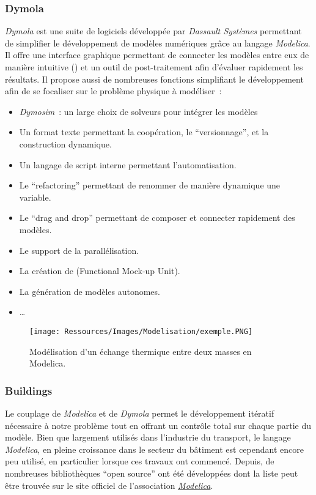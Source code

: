 \subsubsection{Dymola} %
\label{ssub:dymola}
\textit{Dymola} est une suite de logiciels développée par \textit{Dassault Systèmes}
permettant de simplifier le développement de modèles numériques grâce au langage
\textit{Modelica}. Il offre une interface graphique permettant de connecter les modèles
entre eux de manière intuitive () et un outil de
post-traitement afin d’évaluer rapidement les résultats. Il propose aussi de nombreuses fonctions
simplifiant le développement afin de se focaliser sur le problème physique à modéliser~:
\begin{itemize}
    \item \textit{Dymosim}~: un large choix de solveurs pour intégrer les modèles
    \item Un format texte permettant la coopération, le \enquote{versionnage}, et la construction dynamique.
    \item Un langage de script interne permettant l’automatisation.
    \item Le \enquote{refactoring} permettant de renommer de manière dynamique une variable.
    \item Le \enquote{drag and drop} permettant de composer et connecter rapidement des modèles.
    \item Le support de la parallélisation.
    \item La création de  (Functional Mock-up Unit).
    \item La génération de modèles autonomes.
    \item \dots
\end{itemize}

\begin{figure}
    \centering
    \texttt{[image: Ressources/Images/Modelisation/exemple.PNG]}
    \caption[Modélisation d’un échange thermique entre deux masses en Modelica]
            {Modélisation d’un échange thermique entre deux masses en Modelica.}
    \label{fig:exemple_modelica}
\end{figure}


\subsubsection{Buildings} %
\label{ssub:buildings}
Le couplage de \textit{Modelica} et de \textit{Dymola} permet le développement itératif
nécessaire à notre problème tout en offrant un contrôle total sur chaque partie du modèle.
Bien que largement utilisés dans l’industrie du transport, le langage \textit{Modelica},
en pleine croissance dans le secteur du bâtiment est cependant
encore peu utilisé, en particulier lorsque ces travaux ont commencé. Depuis, de nombreuses
bibliothèques \enquote{open source} ont été développées dont la liste peut être trouvée sur le site
officiel de l’association \href{https://www.modelica.org/libraries}{\textit{Modelica}}.

